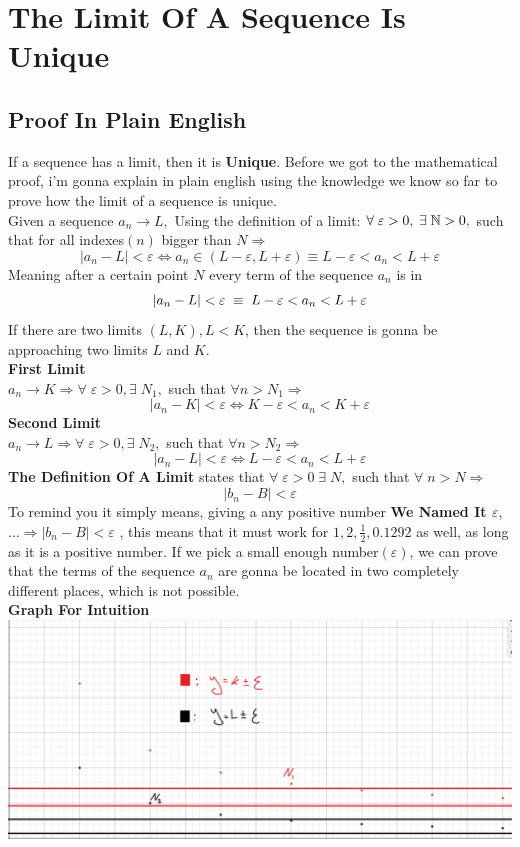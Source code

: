 \section{The Limit Of A Sequence Is Unique}
\subsection{Proof In Plain English}
If a sequence has a limit, then it is \textbf{Unique}. Before we got to the mathematical proof, i'm gonna explain in plain english using the knowledge we know so far to prove how the limit of a sequence is unique.\\
Given a sequence $a_n\rightarrow L,$ Using the definition of a limit: $\forall\; \varepsilon>0,\; \exists\; \mathbb{N}>0,$ such that for all indexes$(n)$ bigger than $N\Longrightarrow$
\[
    |a_n-L|<\varepsilon \iff a_n\in (L-\varepsilon,L+\varepsilon) \equiv L-\varepsilon<a_n<L+\varepsilon
\]
Meaning after a certain point $N$ every term of the sequence $a_n$ is in 
\[
    |a_n-L|<\varepsilon\; \equiv\; L-\varepsilon<a_n<L+\varepsilon\\
\]
If there are two limits $(L,K), L<K$, then the sequence is gonna be approaching two limits $L$ and $K$.\\
\textbf{First Limit}\\
$a_n\rightarrow K \Longrightarrow \forall \; \varepsilon>0, \exists\; N_1,$ such that $\forall n>N_1 \Longrightarrow$
\[
    |a_n-K|<\varepsilon \iff K-\varepsilon<a_n<K+\varepsilon
\]
\textbf{Second Limit}\\
$a_n\rightarrow L \Longrightarrow \forall \; \varepsilon>0, \exists\; N_2,$ such that $\forall n>N_2 \Longrightarrow$
\[
    |a_n-L|<\varepsilon \iff L-\varepsilon<a_n<L+\varepsilon
\]
\textbf{The Definition Of A Limit} states that $\forall\; \varepsilon>0\; \exists\; N,$ such that $\forall\; n>N\Longrightarrow$
\[
    |b_n-B|<\varepsilon
\]
To remind you it simply means, giving a any positive number \textbf{We Named It $\varepsilon$},$\ldots\Longrightarrow |b_n-B|<\varepsilon$ , this means that it must work for $1,2,\frac{1}{2},0.1292$ as well, as long as it is a positive number.
If we pick a small enough number$(\varepsilon)$, we can prove that the terms of the sequence $a_n$ are gonna be located in two completely different places, which is not possible.\\
\textbf{Graph For Intuition}\\
\includegraphics[scale=0.3]{pictures/UniqueLimitGraph.png}
